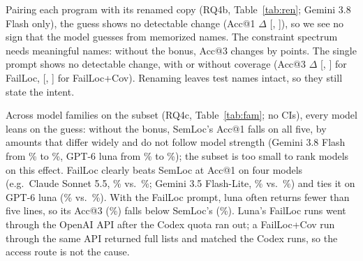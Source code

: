 Pairing each program with its renamed copy (RQ4b, Table~\ref{tab:ren}; Gemini 3.8 Flash only), the
guess shows no detectable change (Acc@1 $\Delta$ \RenRepairedLlmGuessDAccOne{} [\RenRepairedLlmGuessDAccOneLo,
\RenRepairedLlmGuessDAccOneHi]), so we see no sign that the model guesses from memorized names. The constraint spectrum
needs meaningful names: without the bonus, Acc@3 changes by \RenRepairedSemlocNoPriorDAccThree{} points. The single prompt
shows no detectable change, with or without coverage (Acc@3 $\Delta$ \RenRepairedLlmTestsDAccThree{}
[\RenRepairedLlmTestsDAccThreeLo, \RenRepairedLlmTestsDAccThreeHi] for FailLoc, \RenRepairedLlmCoverageDAccThree{}
[\RenRepairedLlmCoverageDAccThreeLo, \RenRepairedLlmCoverageDAccThreeHi] for FailLoc+Cov). Renaming
leaves test names intact, so they still state the intent.

\begin{table}[!t]
\centering
\caption{RQ4b: original vs.\ identifier-renamed programs (repaired labels, three paired repeats)}
\label{tab:ren}
\resizebox{0.8\textwidth}{!}{}
\end{table}

Across model families on the subset (RQ4c, Table~\ref{tab:fam}; no CIs), every model leans on the guess: without the bonus,
SemLoc's Acc@1 falls on all five, by amounts that differ widely and do not follow model strength (Gemini 3.8 Flash from
\FamRepairedGeminiThreeEightFlashSemlocAccOneMean\% to \FamRepairedGeminiThreeEightFlashSemlocNoPriorAccOneMean\%, GPT-6
luna from \FamRepairedGptSixLunaSemlocAccOneMean\% to \FamRepairedGptSixLunaSemlocNoPriorAccOneMean\%); the subset is too
small to rank models on this effect. FailLoc clearly beats SemLoc at Acc@1 on four models (e.g.\ Claude
Sonnet 5.5, \FamRepairedClaudeSonnetFiveFiveLlmTestsAccOneMean\% vs.\ \FamRepairedClaudeSonnetFiveFiveSemlocAccOneMean\%;
Gemini 3.5 Flash-Lite, \FamRepairedGeminiThreeFiveFlashLiteLlmTestsAccOneMean\% vs.\
\FamRepairedGeminiThreeFiveFlashLiteSemlocAccOneMean\%) and ties it on GPT-6 luna
(\FamRepairedGptSixLunaLlmTestsAccOneMean\% vs.\ \FamRepairedGptSixLunaSemlocAccOneMean\%). With the FailLoc prompt, luna often
returns fewer than five lines, so its Acc@3 (\FamRepairedGptSixLunaLlmTestsAccThreeMean\%) falls below SemLoc's
(\FamRepairedGptSixLunaSemlocAccThreeMean\%). Luna's FailLoc runs went through the OpenAI API after the Codex quota ran out; a
FailLoc+Cov run through the same API returned full lists and matched the Codex runs, so the access route is not the cause.

